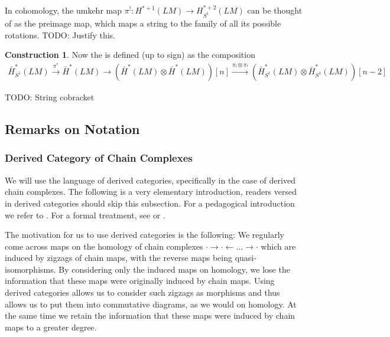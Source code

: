 \documentclass{scrartcl}
\let\emph\relax
\newcommand{\emphi}[1]{\index{#1}\emph{#1}}
\theoremstyle{plain}
\theoremstyle{definition}
\newtheorem{construction}[theorem]{Construction}
\newcommand{\from}{\leftarrow}
\let\xto\xrightarrow
\begin{document}
In cohomology, the umkehr map $\pi^!\colon H^{*+1}(LM)\to H^{*+2}_{S^1}(LM)$ can be thought of as the preimage map, which maps a string to the family of all its possible rotations. TODO: Justify this.

\begin{construction}
    Now the \emphi{string bracket} is defined (up to sign) as the composition
\begin{align*}
    \bar H_{S^1}^*(LM) \xto{\pi^*} \bar H^*(LM)\to (\bar H^*(LM) \otimes \bar H^*(LM))[n] \xto{\pi_!\otimes\pi_!} (\bar H^*_{S^1}(LM)\otimes\bar H^*_{S^1}(LM))[n-2]
\end{align*}
\end{construction}

TODO: String cobracket

\subsection{Remarks on Notation}

\subsubsection{Derived Category of Chain Complexes}

We will use the language of derived categories, specifically in the case of derived chain complexes. The following is a very elementary introduction, readers versed in derived categories should skip this subsection. For a pedagogical introduction we refer to \cite{thomas2001derived}. For a formal treatment, see \cite{gelfand2013methods} or \cite{weibel1994introduction}. 

The motivation for us to use derived categories is the following: We regularly come across maps on the homology of chain complexes $\cdot\to\cdot\from\dots\to\cdot$ which are induced by zigzags of chain maps, with the reverse maps being quasi-isomorphisms. By considering only the induced maps on homology, we lose the information that these maps were originally induced by chain maps. Using derived categories allows us to consider such zigzags as morphisms and thus allows us to put them into commutative diagrams, as we would on homology. At the same time we retain the information that these maps were induced by chain maps to a greater degree.
\end{document}
